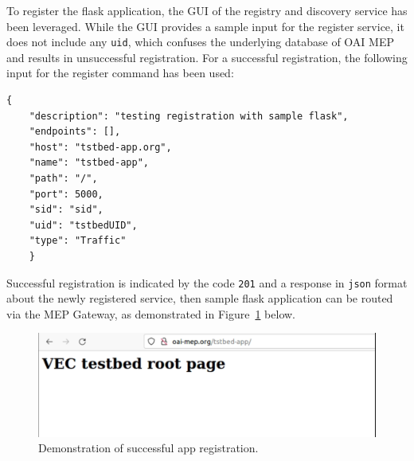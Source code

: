 \documentclass[12pt,a4paper,twoside]{report}
\begin{document}
To register the flask application, the GUI of the registry and discovery service has been leveraged. While the GUI provides a sample input for the register service, it does not include any \verb|uid|, which confuses the underlying database of OAI MEP and results in unsuccessful registration. For a successful registration, the following input for the register command has been used:
%
\begin{verbatim}
{
	"description": "testing registration with sample flask",
	"endpoints": [],
	"host": "tstbed-app.org",
	"name": "tstbed-app",
	"path": "/",
	"port": 5000,
	"sid": "sid",
	"uid": "tstbedUID",
	"type": "Traffic"
	}
\end{verbatim}
Successful registration is indicated by the code \verb|201| and a response in \verb|json| format about the newly registered service, then sample flask application can be routed via the MEP Gateway, as demonstrated in Figure~\ref{F:flask-hello-demo} below.
%
\begin{figure}[!ht]
	\centering
	\includegraphics[width=13cm]{./images/flask-demo.png} 
	\caption{Demonstration of successful app registration.}
	\label{F:flask-hello-demo}
\end{figure}
\end{document}
